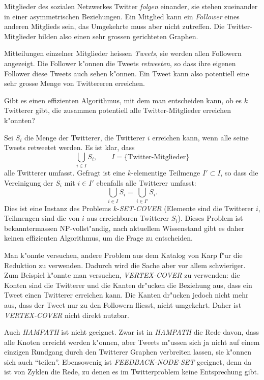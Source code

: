Mitglieder des sozialen Netzwerkes Twitter {\it folgen} einander,
sie stehen zueinander in einer asymmetrischen Beziehungen. Ein Mitglied
kann ein {\it Follower} eines anderen Mitglieds sein, das Umgekehrte
muss aber nicht zutreffen. Die Twitter-Mitglieder bilden also
einen sehr grossen gerichteten Graphen.

Mitteilungen einzelner Mitglieder heissen {\it Tweets}, sie werden
allen Followern angezeigt. Die Follower k"onnen die Tweets {\it retweeten},
so dass ihre eigenen Follower diese Tweets auch sehen k"onnen.
Ein Tweet kann also potentiell eine sehr grosse Menge von Twittereren
erreichen.

Gibt es einen effizienten Algorithmus, mit dem man entscheiden kann,
ob es $k$ Twitterer gibt, die zusammen potentiell alle Twitter-Mitglieder
erreichen k"onnten?

\begin{loesung}
Sei $S_i$ die Menge der Twitterer, die Twitterer $i$ erreichen kann,
wenn alle seine Tweets retweetet werden. Es ist klar, dass
\[
\bigcup_{i\in I}S_i,\qquad I=\{\text{Twitter-Mitglieder}\}
\]
alle Twitterer umfasst. Gefragt ist eine $k$-elementige Teilmenge
$I'\subset I$, so dass die Vereinigung der $S_i$ mit $i\in I'$
ebenfalls alle Twitterer umfasst:
\[
\bigcup_{i\in I}S_i
=
\bigcup_{i\in I'}S_i.
\]
Dies ist eine Instanz des Problems $k$-{\it SET-COVER} (Elemente sind
die Twitterer $i$, Teilmengen sind die von $i$ aus erreichbaren
Twitterer $S_i$). Dieses Problem ist bekanntermassen NP-vollst"andig,
nach aktuellem Wissenstand gibt es daher keinen effizienten Algorithmus, um
die Frage zu entscheiden.

Man k"onnte versuchen, andere Problem aus dem Katalog von Karp f"ur
die Reduktion zu verwenden. Dadurch wird die Sache aber vor allem
schwieriger. Zum Beispiel k"onnte man versuchen, {\it VERTEX-COVER} zu
verwenden: die Konten sind die Twitterer und die Kanten dr"ucken
die Beziehung aus, dass ein Tweet einen Twitterer erreichen kann.
Die Kanten dr"ucken jedoch nicht mehr aus, dass der Tweet nur zu
den Followern fliesst, nicht umgekehrt.
Daher ist {\it VERTEX-COVER} nicht direkt nutzbar.

Auch {\it HAMPATH} ist nicht geeignet.
Zwar ist in {\it HAMPATH} die Rede davon, dass alle Knoten erreicht
werden k"onnen, aber Tweets m"ussen sich ja nicht auf einem einzigen
Rundgang durch den Twitterer Graphen verbreiten lassen, sie k"onnen
sich auch ``teilen''. Ebensowenig ist {\it FEEDBACK-NODE-SET}
geeignet, denn da ist von Zyklen die Rede, zu denen es im Twitterproblem
keine Entsprechung gibt.
\end{loesung}
